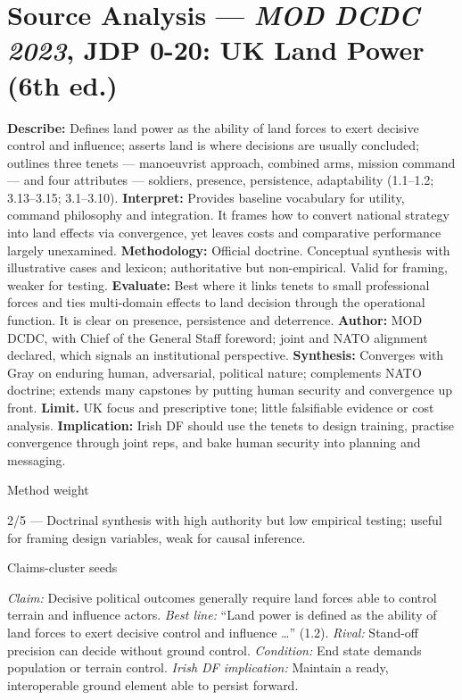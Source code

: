 \section*{Source Analysis — \textit{MOD DCDC 2023}, JDP 0-20: UK Land Power (6th ed.)}
\textbf{Describe:} Defines land power as the ability of land forces to exert decisive control and influence; asserts land is where decisions are usually concluded; outlines three tenets — manoeuvrist approach, combined arms, mission command — and four attributes — soldiers, presence, persistence, adaptability (1.1–1.2; 3.13–3.15; 3.1–3.10).
\textbf{Interpret:} Provides baseline vocabulary for utility, command philosophy and integration. It frames how to convert national strategy into land effects via convergence, yet leaves costs and comparative performance largely unexamined.
\textbf{Methodology:} Official doctrine. Conceptual synthesis with illustrative cases and lexicon; authoritative but non-empirical. Valid for framing, weaker for testing.
\textbf{Evaluate:} Best where it links tenets to small professional forces and ties multi-domain effects to land decision through the operational function. It is clear on presence, persistence and deterrence.
\textbf{Author:} MOD DCDC, with Chief of the General Staff foreword; joint and NATO alignment declared, which signals an institutional perspective.
\textbf{Synthesis:} Converges with Gray on enduring human, adversarial, political nature; complements NATO doctrine; extends many capstones by putting human security and convergence up front.
\textbf{Limit.} UK focus and prescriptive tone; little falsifiable evidence or cost analysis. \textbf{Implication:} Irish DF should use the tenets to design training, practise convergence through joint reps, and bake human security into planning and messaging.

Method weight

2/5 — Doctrinal synthesis with high authority but low empirical testing; useful for framing design variables, weak for causal inference.

Claims-cluster seeds

\textit{Claim:} Decisive political outcomes generally require land forces able to control terrain and influence actors. \textit{Best line:} “Land power is defined as the ability of land forces to exert decisive control and influence …” (1.2). \textit{Rival:} Stand-off precision can decide without ground control. \textit{Condition:} End state demands population or terrain control. \textit{Irish DF implication:} Maintain a ready, interoperable ground element able to persist forward.

